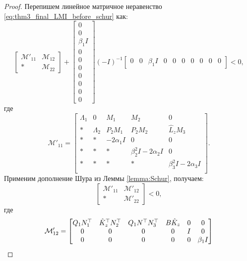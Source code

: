 \begin{proof}
Перепишем линейное матричное неравенство \eqref{eq:thm3_final_LMI_before_schur} как:
%
\begin{equation}
	\label{eq:thm3_final_LMI_before_2schur}
	\begin{bmatrix}
		\mathcal{M}'_{11} & \mathcal{M}_{12} \\
		* & \mathcal{M}_{22}
	\end{bmatrix} 
	+\begin{bmatrix}
		0 \\0\\ \beta_1 I \\0\\0\\0\\0\\0\\0 \\ 0
	\end{bmatrix}
	(-I)^{-1}
	\begin{bmatrix}
		0 & 0 & \beta_1 I & 0&0&0&0&0&0 &0
	\end{bmatrix}<0,
\end{equation}
где
\begin{equation}
	\mathcal{M}'_{11}= \begin{bmatrix}
		{\Lambda}_1 & 0 & {M}_1 & {M}_2&0  \\
		* & {\Lambda}_2 & {P}_2{M}_1 & {P}_2{M}_2 & \hat{{L}}_z{M}_3\\
		* & * & -2\alpha_1 {I} & 0&0\\
		* & * &*  & \beta_2^2{I}-2\alpha_2 {I}&0\\
		*& * & * &*  &\beta_3^2{I}-2\alpha_3 {I}\\
	\end{bmatrix}.
\end{equation}
%
Применим дополнение Шура из Леммы \ref{lemma:Schur}, получаем:
\begin{equation}
	\label{eq:thm3_final_LMI_before_3schur}
	\begin{bmatrix}
		\mathcal{M}'_{11} & \mathcal{M}'_{12} \\
		* & \mathcal{M}'_{22}
	\end{bmatrix}<0,
\end{equation}
где
\begin{equation}
	\mathcal{M}'_{12}= \begin{bmatrix}
		{Q}_1{N}_1^\top & \hat{{K}}_z^\top{N}_2^\top & {Q}_1 {N}^\top{N}_3^\top & {B}\hat{{K}}_z & 0 & 0\\
		0&0&0&0&I &0\\
		0&0& 0&0&0 & \beta_1 I\\

\end{bmatrix}
\end{equation}
\end{proof}
